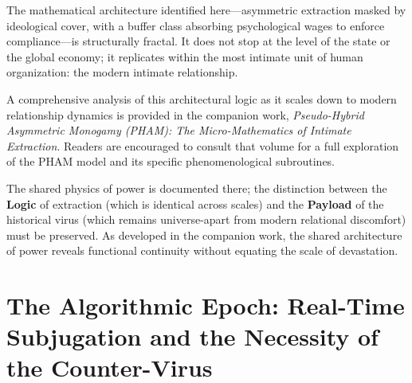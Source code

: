 The mathematical architecture identified here---asymmetric extraction masked by ideological cover, with a buffer class absorbing psychological wages to enforce compliance---is structurally fractal. It does not stop at the level of the state or the global economy; it replicates within the most intimate unit of human organization: the modern intimate relationship.

A comprehensive analysis of this architectural logic as it scales down to modern relationship dynamics is provided in the companion work, \textit{Pseudo-Hybrid Asymmetric Monogamy (PHAM): The Micro-Mathematics of Intimate Extraction}. Readers are encouraged to consult that volume for a full exploration of the PHAM model and its specific phenomenological subroutines.

The shared physics of power is documented there; the distinction between the \textbf{Logic} of extraction (which is identical across scales) and the \textbf{Payload} of the historical virus (which remains universe-apart from modern relational discomfort) must be preserved. As developed in the companion work, the shared architecture of power reveals functional continuity without equating the scale of devastation.

\chapter{The Algorithmic Epoch: Real-Time Subjugation and the Necessity of the Counter-Virus}
\label{ch:algorithmic_epoch}

